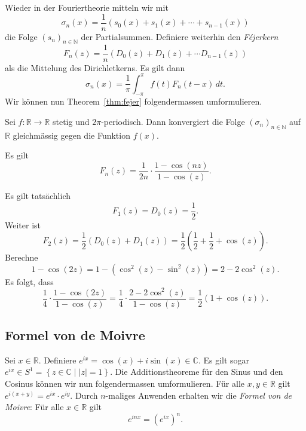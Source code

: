 \documentclass[../main.tex]{subfiles}
\begin{document}
Wieder in der Fouriertheorie mitteln wir mit
\[
  \sigma_n(x) = \frac{1}{n}(s_0 (x) + s_1(x) + \cdots + s_{n-1}(x))
\]
die Folge ${(s_{n})}_{n \in \mathbb{N}}$ der Partialsummen. Definiere
weiterhin den \emph{Féjerkern}
\[
  F_n(z) = \frac{1}{n}(D_0(z) + D_1(z) + \cdots D_{n-1}(z))
\]
als die Mittelung des Dirichletkerns. Es gilt dann
\[
  \sigma_n(x) = \frac{1}{\pi} \int_{-\pi}^{\pi} f(t) F_n(t-x) \, dt.
\]
Wir können nun Theorem~\ref{thm:fejer} folgendermassen umformulieren.

\begin{theorem2}[Fejér]
  Sei $f \colon \mathbb{R} \to \mathbb{R}$ 
  stetig und $2\pi$-periodisch. Dann konvergiert
  die Folge ${(\sigma_{n})}_{n \in \mathbb{N}}$ 
  auf $\mathbb{R}$ gleichmässig gegen
  die Funktion $f(x)$.
\end{theorem2}

\begin{lemma}\label{lem:fejerkern}
  Es gilt
  \[
    F_n(z) = \frac{1}{2n} \cdot \frac{1 - \cos(nz)}{1 - \cos(z)}.
  \]
\end{lemma}

\begin{example}
  Es gilt tatsächlich
  \[
    F_1(z) = D_0(z) = \frac{1}{2}.
  \]
  Weiter ist
  \[
    F_2(z) = \frac{1}{2}(D_0(z) + D_1(z)) = 
    \frac{1}{2}\left(\frac{1}{2} + \frac{1}{2} + \cos(z)\right).
  \]
  Berechne
  \[
    1 - \cos(2z) = 1 - (\cos^2(z) - \sin^2(z))
    = 2 - 2\cos^2(z).
  \]
  Es folgt, dass
  \[
    \frac{1}{4} \cdot \frac{1 - \cos(2z)}{1 - \cos(z)}
    = \frac{1}{4} \cdot \frac{2 - 2 \cos^2(z) }{1 - \cos(z)}
    = \frac{1}{2} (1 + \cos(z)).
  \]
\end{example}

\subsection*{Formel von de Moivre}
Sei $x \in \mathbb{R}$.
Definiere $e^{ix} = \cos(x) + i \sin(x) \in \mathbb{C}$.
Es gilt sogar
\(
  e^{ix} \in S^1 = \left\{z \in \mathbb{C} \mid |z|  = 1 \right\}
\).
Die Additionstheoreme für den Sinus und den Cosinus können wir
nun folgendermassen umformulieren. Für alle $x, y \in \mathbb{R}$ 
gilt
\(
  e^{i(x + y)} = e^{ix} \cdot e^{iy}.
\)
Durch $n$-maliges Anwenden erhalten wir die \emph{Formel von de Moivre}:
Für alle $x \in \mathbb{R}$ gilt
\[
  e^{inx} = {(e^{ix})}^n.
\]
\end{document}
